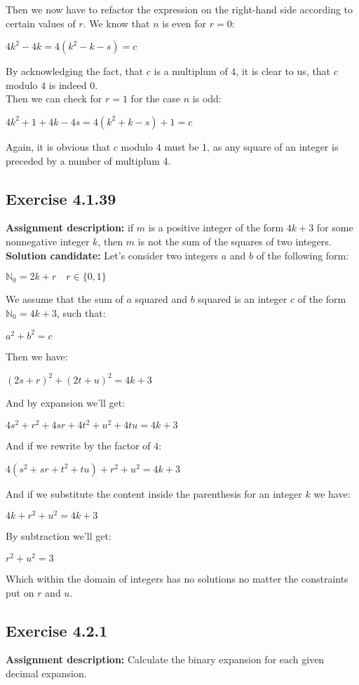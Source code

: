 \documentclass{report}
\newcommand{\cent}[1]{\begin{center}#1\end{center}}
\newcommand{\doubleN}{\mathbb{N}}
\newcommand{\In}{\! \in \!}
\newcommand{\AssignmentDescription}{\textbf{Assignment description: }}
\newcommand{\Solution}{\textbf{Solution candidate: }}
\newcommand{\QED}{\boxed{}}
\newcommand{\Exercise}[1]{\subsection{Exercise #1}}
\newcommand{\defaultEnumerateLabel}{\textbf{\alph*.}}
\begin{document}
\begin{enumerate}[label=\defaultEnumerateLabel]
	Then we now have to refactor the expression on the right-hand side according to certain values of $r$. We know that $n$ is even for $r=0$:
	
	\cent{$4k^2 - 4k = 4(k^2 - k - s) = c$}
	
	By acknowledging the fact, that $c$ is a multiplum of 4, it is clear to us, that $c$ modulo $4$ is indeed 0.\\
	
	Then we can check for $r=1$ for the case $n$ is odd:
	
	\cent{$4k^2 + 1 + 4k -4s = 4(k^2+k-s)+1 = c$}
	
	Again, it is obvious that $c$ modulo $4$ must be 1, as any square of an integer is preceded by a number of multiplum 4.\\
	
	\QED
	
	\Exercise{4.1.39}
	
	\AssignmentDescription
	if $ m $ is a positive integer of the form $ 4k + 3 $ for some nonnegative integer $ k $, then $ m $ is not the sum of the squares of two integers.\\
	
	\Solution
	Let's consider two integers $a$ and $b$ of the following form:
	
	\cent{$\doubleN_0 = 2k+r \quad r \In \{0,1\}$}
	
	We assume that the sum of $a$ squared and $b$ squared is an integer $c$ of the form $\doubleN_0 = 4k+3$, such that:
	
	\cent{$a^2 +b^2 = c$}
	
	Then we have:
	
	\cent{$(2s+r)^2 + (2t+u)^2 = 4k + 3$}
	
	And by expansion we'll get:
	
	\cent{$4s^2 + r^2 +4sr + 4t^2 + u^2 + 4tu = 4k + 3$}
	
	And if we rewrite by the factor of $4$:
	
	\cent{$4(s^2+sr+t^2+tu) + r^2 + u^2 = 4k + 3$}
	
	And if we substitute the content inside the parenthesis for an integer $k$ we have:
	
	\cent{$4k + r^2 + u^2 = 4k + 3$}
	
	By subtraction we'll get:
	
	\cent{$r^2 + u^2 = 3$}
	
	Which within the domain of integers has no solutions no matter the constraints put on $r$ and $u$.\\
	\QED
	\Exercise{4.2.1}
	\AssignmentDescription Calculate the binary expansion for each given decimal expansion.\\
	

\end{enumerate}
\end{document}
